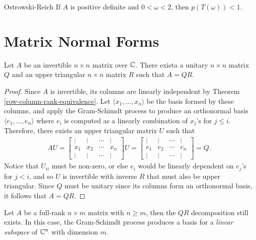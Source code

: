 \begin{thm}{Ostrowski-Reich}\label{ostrowski-reich}\proofbreak
    If $A$ is positive definite and $0 < \omega < 2$, then $p(T(\omega)) < 1$.
\end{thm}

\section{Matrix Normal Forms}

\begin{thm}
    Let $A$ be an invertible $n \times n$ matrix over $\mathbb{C}$. There exista a unitary $n \times n$ matrix $Q$ and an upper triangular $n \times n$ matrix $R$ such that $A = QR$.
\end{thm}

\begin{proof}
    Since $A$ is invertible, its columns are linearly independent by Theorem \ref{row-column-rank-equivalence}. Let $\langle x_1, \ldots, x_n \rangle$ be the basis formed by these columns, and apply the Gram-Schimdt process to produce an orthonormal basis $\langle e_1, \ldots, e_n \rangle $ where $e_i$ is computed as a linearly combination of $x_j$'s for $j \leq i$. Therefore, there exists an upper triangular matrix $U$ such that
    \begin{align*}
        AU = 
        \begin{bmatrix}
            \vdots & \vdots & \cdots & \vdots \\
            x_1 & x_2 & \cdots & x_n \\
            \vdots & \vdots & \cdots & \vdots
        \end{bmatrix}U = \begin{bmatrix}
            \vdots & \vdots & \cdots & \vdots \\
            e_1 & e_2 & \cdots & e_n \\
            \vdots & \vdots & \cdots & \vdots
        \end{bmatrix} = Q.
    \end{align*}
    Notice that $U_{ii}$ must be non-zero, or else $e_i$ would be linearly dependent on $e_j$'s for $j < i$, and so $U$ is invertible with inverse $R$ that must also be upper triangular. Since $Q$ must be unitary since its columns form an orthonormal basis, it follows that $A = QR$.
\end{proof}

\begin{rmk}
    Let $A$ be a full-rank $n \times m$ matrix with $n \geq m$, then the $QR$ decomposition still exists. In this case, the Gram-Schimdt process produces a basis for a \emph{linear subspace} of $\mathbb{C}^n$ with dimension $m$.
\end{rmk}

